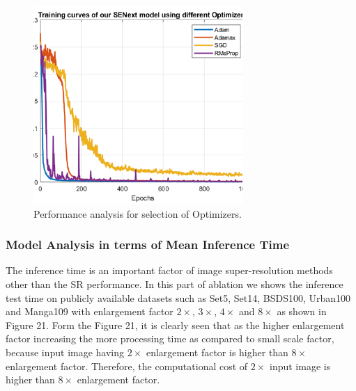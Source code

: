 \documentclass{ieeeaccess}
\begin{document}
\begin{figure}[ht]
  \includegraphics[width=\linewidth]{20FIGURE.pdf}
  \caption{Performance analysis for selection of Optimizers.}
  \label{fig:17}
\end{figure}



\subsubsection{Model Analysis in terms of Mean Inference Time}
The inference time is an important factor of image super-resolution methods other than the SR performance. In this part of ablation we shows the inference test time on publicly available datasets such as Set5, Set14, BSDS100, Urban100 and Manga109 with enlargement factor $2\times$, $3\times$, $4\times$ and $8\times$ as shown in Figure 21. Form the Figure 21, it is clearly seen that as the higher enlargement factor increasing the more processing time as compared to small scale factor, because input image having $2\times$ enlargement factor is higher than $8\times$ enlargement factor. Therefore, the computational cost of $2\times$ input image is higher than $8\times$ enlargement factor.
\end{document}
